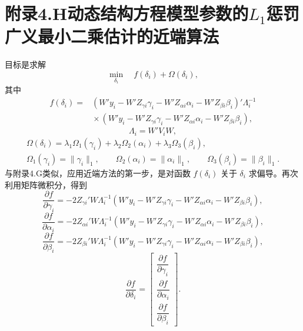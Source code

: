 \section*{附录4.H\quad 动态结构方程模型参数的\texorpdfstring{$L_1$}{L1}惩罚广义最小二乘估计的近端算法}

目标是求解
\begin{equation}
\min_{\delta_i}\quad f(\delta_i)+\Omega(\delta_i),\tag{4.H.1}
\end{equation}
其中
\[
\begin{aligned}
f(\delta_i)={}&
(W'y_i-W'Z_{\gamma i}\gamma_i-W'Z_{\alpha i}\alpha_i-W'Z_{\beta i}\beta_i)'\Lambda_i^{-1}\\
&{}\times(W'y_i-W'Z_{\gamma i}\gamma_i-W'Z_{\alpha i}\alpha_i-W'Z_{\beta i}\beta_i),
\end{aligned}
\]
\[
\Lambda_i=W'V_iW,
\]
\[
\begin{gathered}
\Omega(\delta_i)=\lambda_1\Omega_1(\gamma_i)+\lambda_2\Omega_2(\alpha_i)+\lambda_3\Omega_3(\beta_i),\\
\Omega_1(\gamma_i)=\|\gamma_i\|_1,\qquad
\Omega_2(\alpha_i)=\|\alpha_i\|_1,\qquad
\Omega_3(\beta_i)=\|\beta_i\|_1.
\end{gathered}
\]
与附录4.G类似，应用近端方法的第一步，是对函数 $f(\delta_i)$ 关于 $\delta_i$ 求偏导。再次利用矩阵微积分，得到
\begin{equation}
\frac{\partial f}{\partial\gamma_i}=-2Z_{\gamma i}'W\Lambda_i^{-1}
(W'y_i-W'Z_{\gamma i}\gamma_i-W'Z_{\alpha i}\alpha_i-W'Z_{\beta i}\beta_i),\tag{4.H.2}
\end{equation}
\begin{equation}
\frac{\partial f}{\partial\alpha_i}=-2Z_{\alpha i}'W\Lambda_i^{-1}
(W'y_i-W'Z_{\gamma i}\gamma_i-W'Z_{\alpha i}\alpha_i-W'Z_{\beta i}\beta_i),\tag{4.H.3}
\end{equation}
\begin{equation}
\frac{\partial f}{\partial\beta_i}=-2Z_{\beta i}'W\Lambda_i^{-1}
(W'y_i-W'Z_{\gamma i}\gamma_i-W'Z_{\alpha i}\alpha_i-W'Z_{\beta i}\beta_i),\tag{4.H.4}
\end{equation}
\begin{equation}
\frac{\partial f}{\partial\delta_i}=\begin{bmatrix}
\dfrac{\partial f}{\partial\gamma_i}\\
\dfrac{\partial f}{\partial\alpha_i}\\
\dfrac{\partial f}{\partial\beta_i}
\end{bmatrix}.\tag{4.H.5}
\end{equation}
